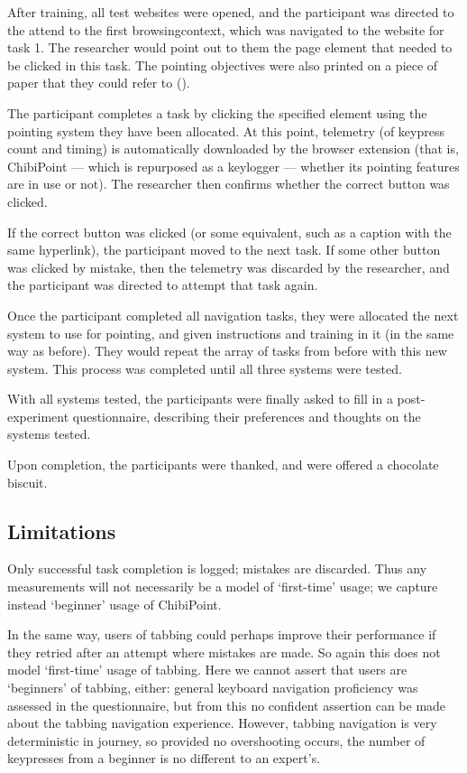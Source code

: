 \documentclass[11pt,openright,a4paper]{report}
\begin{document}
After training, all test websites were opened, and the participant was directed to the attend to the first \gls{browsingcontext}, which was navigated to the website for task 1. The researcher would point out to them the page element that needed to be clicked in this task. The pointing objectives were also printed on a piece of paper that they could refer to ().

The participant completes a task by clicking the specified element using the pointing system they have been allocated. At this point, telemetry (of keypress count and timing) is automatically downloaded by the browser extension (that is, ChibiPoint --- which is repurposed as a keylogger --- whether its pointing features are in use or not). The researcher then confirms whether the correct button was clicked.

If the correct button was clicked (or some equivalent, such as a caption with the same hyperlink), the participant moved to the next task. If some other button was clicked by mistake, then the telemetry was discarded by the researcher, and the participant was directed to attempt that task again.

Once the participant completed all navigation tasks, they were allocated the next system to use for pointing, and given instructions and training in it (in the same way as before). They would repeat the array of tasks from before with this new system. This process was completed until all three systems were tested.

With all systems tested, the participants were finally asked to fill in a post-experiment questionnaire, describing their preferences and thoughts on the systems tested.

Upon completion, the participants were thanked, and were offered a chocolate biscuit.

\subsection{Limitations}
Only successful task completion is logged; mistakes are discarded. Thus any measurements will not necessarily be a model of `first-time' usage; we capture instead `beginner' usage of ChibiPoint.

In the same way, users of tabbing could perhaps improve their performance if they retried after an attempt where mistakes are made. So again this does not model `first-time' usage of tabbing. Here we cannot assert that users are `beginners' of tabbing, either: general keyboard navigation proficiency was assessed in the questionnaire, but from this no confident assertion can be made about the tabbing navigation experience. However, tabbing navigation is very deterministic in journey, so provided no overshooting occurs, the number of keypresses from a beginner is no different to an expert's.
\end{document}
